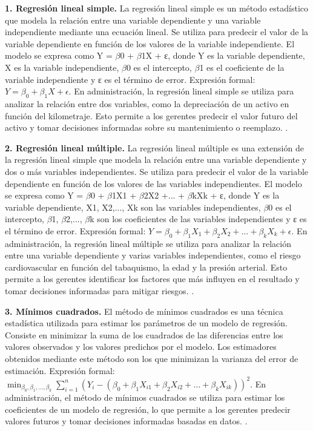 {\textbf{1. Regresión lineal simple.} La regresión lineal simple es un método estadístico que modela la relación entre una variable dependiente y una variable independiente mediante una ecuación lineal. Se utiliza para predecir el valor de la variable dependiente en función de los valores de la variable independiente. El modelo se expresa como Y = $\beta$0 + $\beta$1X + ε, donde Y es la variable dependiente, X es la variable independiente, $\beta$0 es el intercepto, $\beta$1 es el coeficiente de la variable independiente y ε es el término de error. Expresión formal: $Y = \beta_0 + \beta_1X + \epsilon$. En administración, la regresión lineal simple se utiliza para analizar la relación entre dos variables, como la depreciación de un activo en función del kilometraje. Esto permite a los gerentes predecir el valor futuro del activo y tomar decisiones informadas sobre su mantenimiento o reemplazo. \citep{anderson2012,lind2012,wackerly2010}.

\textbf{2. Regresión lineal múltiple.} La regresión lineal múltiple es una extensión de la regresión lineal simple que modela la relación entre una variable dependiente y dos o más variables independientes. Se utiliza para predecir el valor de la variable dependiente en función de los valores de las variables independientes. El modelo se expresa como Y = $\beta$0 + $\beta$1X1 + $\beta$2X2 +... + $\beta$kXk + ε, donde Y es la variable dependiente, X1, X2,..., Xk son las variables independientes, $\beta$0 es el intercepto, $\beta$1, $\beta$2,..., $\beta$k son los coeficientes de las variables independientes y ε es el término de error. Expresión formal: $Y = \beta_0 + \beta_1X_1 + \beta_2X_2 + \ldots + \beta_kX_k + \epsilon$. En administración, la regresión lineal múltiple se utiliza para analizar la relación entre una variable dependiente y varias variables independientes, como el riesgo cardiovascular en función del tabaquismo, la edad y la presión arterial. Esto permite a los gerentes identificar los factores que más influyen en el resultado y tomar decisiones informadas para mitigar riesgos. \citep{anderson2012,lind2012,wackerly2010}.

\textbf{3. Mínimos cuadrados.} El método de mínimos cuadrados es una técnica estadística utilizada para estimar los parámetros de un modelo de regresión. Consiste en minimizar la suma de los cuadrados de las diferencias entre los valores observados y los valores predichos por el modelo. Los estimadores obtenidos mediante este método son los que minimizan la varianza del error de estimación. Expresión formal: $\min_{\beta_0, \beta_1, \ldots, \beta_k} \sum_{i=1}^n (Y_i - (\beta_0 + \beta_1X_{i1} + \beta_2X_{i2} + \ldots + \beta_kX_{ik}))^2$. En administración, el método de mínimos cuadrados se utiliza para estimar los coeficientes de un modelo de regresión, lo que permite a los gerentes predecir valores futuros y tomar decisiones informadas basadas en datos. \citep{anderson2012,lind2012,wackerly2010}.

}
